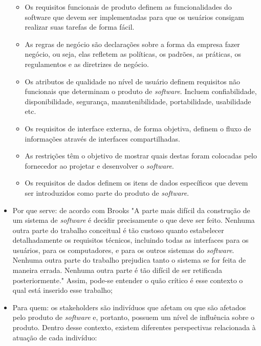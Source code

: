 \begin{itemize}
\begin{itemize}
        \item Os requisitos funcionais de produto definem as funcionalidades do software que devem ser implementadas para que os usuários consigam realizar suas tarefas de forma fácil.
        
        \item As regras de negócio são declarações sobre a forma da empresa fazer negócio, ou seja, elas refletem as políticas, os padrões, as práticas, os regulamentos e as diretrizes de negócio.
        
        \item Os atributos de qualidade no nível de usuário definem requisitos não funcionais que determinam o produto de \textit{software}. Incluem confiabilidade, disponibilidade, segurança, manutenibilidade, portabilidade, usabilidade etc.
        
        \item Os requisitos de interface externa, de forma objetiva, definem o fluxo de informações através de interfaces compartilhadas.
        
        \item As restrições têm o objetivo de mostrar quais destas foram colocadas pelo fornecedor ao projetar e desenvolver o \textit{software}.
        
        \item Os requisitos de dados definem os itens de dados específicos que devem ser introduzidos como parte do produto de \textit{software}.
    
    \end{itemize}
    
    \item Por que serve: de acordo com Brooks \cite[p.~199]{brooks1995mythical} "A parte mais difícil da construção de um sistema de \textit{software} é decidir precisamente o que deve ser feito. Nenhuma outra parte do trabalho conceitual é tão  custoso quanto estabelecer detalhadamente os requisitos técnicos, incluindo todas as interfaces para os usuários, para os computadores, e para os outros sistemas do \textit{software}. Nenhuma outra parte do trabalho prejudica tanto o sistema se for feita de maneira errada. Nenhuma outra parte é tão difícil de ser retificada posteriormente." Assim, pode-se entender o quão crítico é esse contexto o qual está inserido esse trabalho;
    
    \item Para quem: os stakeholders são indivíduos que afetam ou que são afetados pelo produto de \textit{software} e, portanto, possuem um nível de influência sobre o produto. Dentro desse contexto, existem diferentes perspectivas relacionada à atuação de cada indivíduo:
    

\end{itemize}
